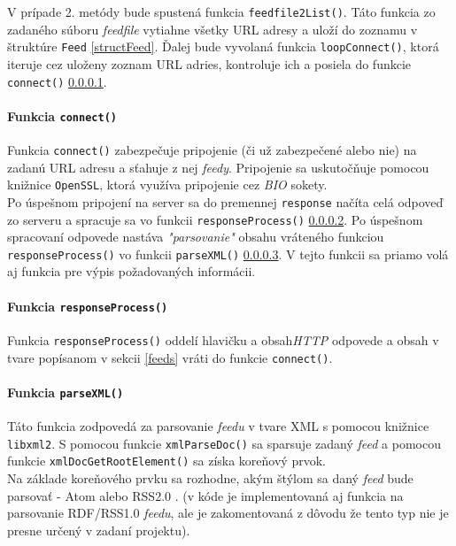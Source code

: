 \documentclass[a4paper, 11pt]{article}
\begin{document}
    V prípade 2. metódy bude spustená funkcia \texttt{feedfile2List()}. Táto funkcia zo zadaného súboru \textit{feedfile} vytiahne všetky URL adresy a uloží do zoznamu v štruktúre \texttt{Feed} \ref{structFeed}. Ďalej bude vyvolaná funkcia \texttt{loopConnect()}, ktorá iteruje cez uloženy zoznam URL adries, kontroluje ich a posiela do funkcie \texttt{connect()} \ref{connect}. \\

    \paragraph{Funkcia \texttt{connect()}}
    \label{connect}
    Funkcia \texttt{connect()} zabezpečuje pripojenie (či už zabezpečené alebo nie) na zadanú URL adresu a sťahuje z nej \textit{feedy}. Pripojenie sa uskutočňuje pomocou knižnice \texttt{OpenSSL}, ktorá využíva pripojenie cez \textit{BIO} sokety\cite{openSSL}. \\

    Po úspešnom pripojení na server sa do premennej \texttt{response} načíta celá odpoveď zo serveru a spracuje sa vo funkcii \texttt{responseProcess()} \ref{responseProc}. Po úspešnom spracovaní odpovede nastáva \textit{"parsovanie"} obsahu vráteného funkciou \texttt{responseProcess()} vo funkcii \texttt{parseXML()} \ref{parse}. V tejto funkcii sa priamo volá aj funkcia pre výpis požadovaných informácii. \\

    \paragraph{Funkcia \texttt{responseProcess()}}
    \label{responseProc}
    Funkcia \texttt{responseProcess()} oddelí hlavičku a obsah\textit{HTTP} odpovede a obsah v tvare popísanom v sekcii \ref{feeds} vráti do funkcie \texttt{connect()}. 

    \paragraph{Funkcia \texttt{parseXML()}}
    \label{parse}
    Táto funkcia zodpovedá za parsovanie \textit{feedu} v tvare XML s pomocou knižnice \texttt{libxml2}. S pomocou funkcie \texttt{xmlParseDoc()} sa sparsuje zadaný \textit{feed} a pomocou funkcie \texttt{xmlDocGetRootElement()} sa získa koreňový prvok. \\
    
    Na základe koreňového prvku sa rozhodne, akým štýlom sa daný \textit{feed} bude parsovať - Atom alebo RSS2.0 . (v kóde je implementovaná aj funkcia na parsovanie RDF/RSS1.0 \textit{feedu}, ale je zakomentovaná z dôvodu že tento typ nie je presne určený v zadaní projektu).\\
\end{document}
